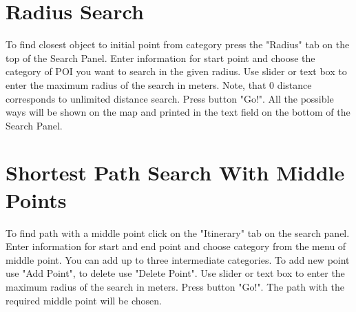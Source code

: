 \section{Radius Search}
	To find closest object to initial point from category press the "Radius" tab on the top of the Search Panel. Enter information for start point and choose the category of POI you want to search in the given radius. Use slider or text box to enter the maximum radius of the search in meters. Note, that 0 distance corresponds to unlimited distance search. Press button "Go!". All the possible ways will be shown on the map and printed in the text field on the bottom of the Search Panel.

\section{Shortest Path Search With Middle Points}
	To find path with a middle point click on the "Itinerary" tab on the search panel. Enter information for start and end point and choose category from the menu of middle point. You can add up to three intermediate categories. To add new point use "Add Point", to delete use "Delete Point". Use slider or text box to enter the maximum radius of the search in meters. Press button "Go!". The path with the required middle point will be chosen.
	